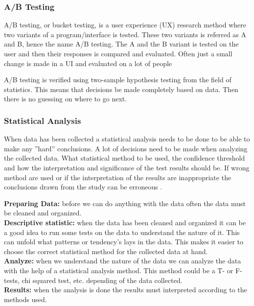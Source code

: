 



\subsubsection{A/B Testing}%
\label{sub:A/B Testing}
A/B testing, or bucket testing, is a user experience (UX) research method where two variants of a program/interface is tested. These two variants is referred as  A and B, hence the name A/B testing. The A and the B variant is tested on the user and then their responses is compared and evaluated. Often just a small change is made in a UI and evaluated on a lot of people 
 
A/B testing is verified using two-sample hypothesis testing from the field of statistics. This means that decisions be made completely based on data. Then there is no guessing on where to go next.




\subsubsection{Statistical Analysis}%
\label{sub:Statistical analysis}
When data has been collected a statistical analysis needs to be done to be able to make any ''hard'' conclusions. A lot of decisions need to be made when analyzing the collected data. What statistical method to be used, the confidence threshold and how the interpretation and significance of the test results should be. If wrong method are used or if the interpretation of the results are inappropriate the conclusions drawn from the study can be erroneous \cite{lazar2017research}. 


\textbf{Preparing Data:} before we can do anything with the data often the data must be cleaned and organized.\\
\textbf{Descriptive statistic:} when the data has been cleaned and organized it can be a good idea to run some tests on the data to understand the nature of it. This can unfold what patterns or tendency's lays in the data. This makes it easier to choose the correct statistical method for the collected data at hand.\\
\textbf{Analyze:} when we understand the nature of the data we can analyze the data with the help of a statistical analysis method. This method could be a T- or F-tests, chi squared test, etc. depending of the data collected.\\ 
\textbf{Results:} when the analysis is done the results must interpreted according to the methods used.\\


